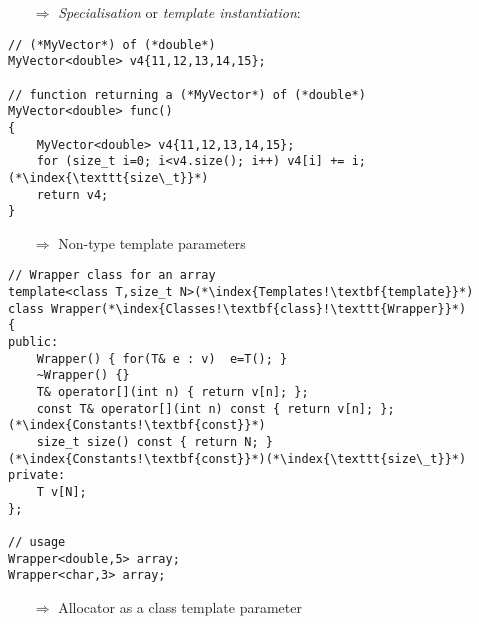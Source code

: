 \documentclass[10pt]{article}
\begin{document}
\begin{enumerate}
\item[$\Rightarrow$] \emph{Specialisation} or \emph{template instantiation}:
\end{enumerate}
\begin{lstlisting}
// (*MyVector*) of (*double*)
MyVector<double> v4{11,12,13,14,15};

// function returning a (*MyVector*) of (*double*)
MyVector<double> func()
{
    MyVector<double> v4{11,12,13,14,15};
    for (size_t i=0; i<v4.size(); i++) v4[i] += i;(*\index{\texttt{size\_t}}*)
    return v4;
}
\end{lstlisting}
\begin{enumerate}
\item[$\Rightarrow$] Non-type template parameters
\end{enumerate}
\begin{lstlisting}
// Wrapper class for an array 
template<class T,size_t N>(*\index{Templates!\textbf{template}}*)
class Wrapper(*\index{Classes!\textbf{class}!\texttt{Wrapper}}*)
{
public:
    Wrapper() { for(T& e : v)  e=T(); }
    ~Wrapper() {}
    T& operator[](int n) { return v[n]; };
    const T& operator[](int n) const { return v[n]; };(*\index{Constants!\textbf{const}}*)
    size_t size() const { return N; }(*\index{Constants!\textbf{const}}*)(*\index{\texttt{size\_t}}*)
private:
    T v[N];
};

// usage
Wrapper<double,5> array;
Wrapper<char,3> array;
\end{lstlisting}
\begin{enumerate}
\item[$\Rightarrow$] Allocator as a class template parameter
\end{enumerate}
\end{document}

